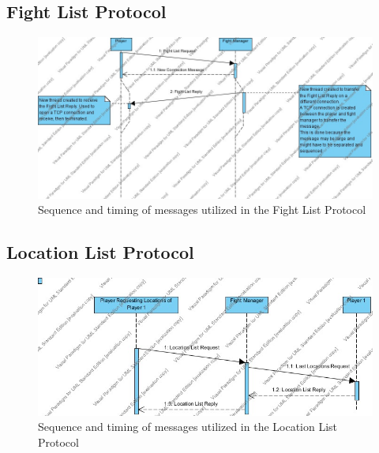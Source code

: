 \documentclass[12pt]{article}
\begin{document}
	\subsection{Fight List Protocol}
		\begin{center}
			\begin{figure}[htp]
				\centering
				\includegraphics[width=\textwidth]{Diagrams/Sequence Diagrams/Fight List Protocol Sequence.jpg}
				\caption{Sequence and timing of messages utilized in the Fight List Protocol}
			\end{figure}
		\end{center}
	\newpage
	\subsection{Location List Protocol}
		\begin{center}
			\begin{figure}[htp]
				\centering
				\includegraphics[width=.7\textwidth]{Diagrams/Sequence Diagrams/Location List Protocol Sequence.jpg}
				\caption{Sequence and timing of messages utilized in the Location List Protocol}
			\end{figure}
		\end{center}
	\newpage
\end{document}
